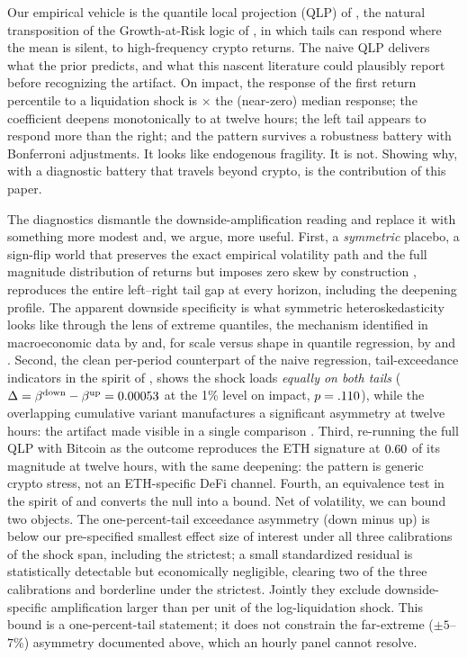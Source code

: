 Our empirical vehicle is the quantile local projection (QLP) of
\citet{han2024}, the natural transposition of the Growth-at-Risk logic of
\citet{adrian2019}, in which tails can respond where the mean is silent, to
high-frequency crypto returns. The naive QLP delivers what the prior
predicts, and what this nascent literature could plausibly report before
recognizing the artifact.
On impact, the response of the first return percentile to a liquidation shock
is \RatioTailMedImpact$\times$ the (near-zero) median response; the
coefficient deepens monotonically to \BetaQoneHtwelve{} at twelve hours; the
left tail appears to respond more than the right; and the pattern survives a
robustness battery with Bonferroni adjustments. It looks like
endogenous fragility. It is not. Showing why, with a
diagnostic battery that travels beyond crypto, is the contribution of this
paper.

The diagnostics dismantle the downside-amplification reading and replace it
with something more modest and, we argue, more useful. First, a
\emph{symmetric} placebo, a sign-flip world that preserves the exact
empirical volatility path and the full magnitude distribution of returns but
imposes zero skew by construction \citep{wu1986,liu1988,davidson2008},
reproduces the entire left--right tail gap at every horizon, including the
deepening profile. The apparent downside specificity is what symmetric
heteroskedasticity looks like through the lens of extreme quantiles, the
mechanism identified in macroeconomic data by \citet{carriero2024} and, for
scale versus shape in quantile regression, by \citet{koenker1982} and
\citet{machado2000}. Second, the clean per-period counterpart of the naive
regression, tail-exceedance indicators in the spirit of
\citet{engle2004}, shows the shock loads \emph{equally on both tails}
($\Delta = \beta^{\text{down}} - \beta^{\text{up}} = 0.00053$ at the
1\% level on impact, $p = .110$), while the overlapping cumulative
variant manufactures a significant asymmetry at twelve hours: the artifact
made visible in a single comparison \citep{hodrick1992,boudoukh2008,
neuberger2021,farago2023}. Third, re-running the full QLP with
Bitcoin as the outcome reproduces the ETH signature at
$0.60{}$ of its magnitude at twelve hours, with the same
deepening: the pattern is generic crypto stress, not an ETH-specific DeFi
channel. Fourth, an equivalence test in the spirit of
\citet{altman1995} and \citet{lakens2017} converts the null into a bound.
Net of volatility, we can bound two objects. The one-percent-tail
exceedance asymmetry (down minus up) is below our pre-specified smallest
effect size of interest under all three calibrations of the shock span,
including the strictest; a small standardized residual is statistically
detectable but economically negligible, clearing two of the three
calibrations and borderline under the strictest. Jointly they exclude
downside-specific amplification larger than \MdeEightyExc{} per unit of the
log-liquidation shock. This bound is a
one-percent-tail statement; it does not constrain the far-extreme
($\pm 5$--$7\%$) asymmetry documented above, which an hourly panel cannot resolve.


